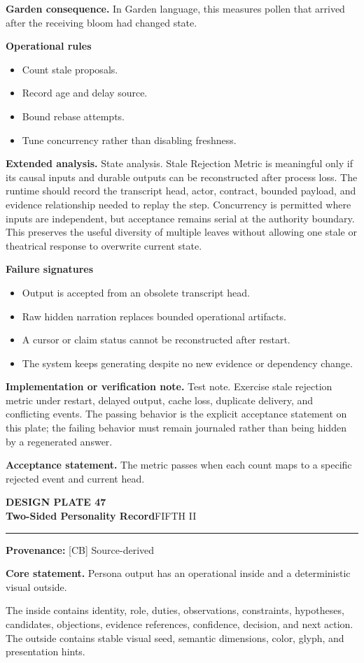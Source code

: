 \documentclass[10pt,letterpaper,oneside]{article}
\newcommand{\prov}[1]{\textcolor{gardenBlue}{\sffamily\footnotesize\textbf{Provenance:} #1}}
\newcommand{\platetitle}[3]{%
  \begin{minipage}[t][0.54in][t]{\textwidth}
  {\sffamily\bfseries\color{gardenDeep}\fontsize{9}{10}\selectfont DESIGN PLATE #1}\\[-1pt]
  {\sffamily\bfseries\color{gardenInk}\fontsize{16.5}{18}\selectfont #2}\hfill{\sffamily\color{gardenGreen}\large #3}
  \end{minipage}\vspace{-2pt}\hrule\vspace{5pt}}
\begin{document}
\textbf{Garden consequence.} In Garden language, this measures pollen that arrived after the receiving bloom had changed state.

\textbf{Operational rules}
\begin{itemize}
\item Count stale proposals.
\item Record age and delay source.
\item Bound rebase attempts.
\item Tune concurrency rather than disabling freshness.
\end{itemize}
\textbf{Extended analysis.} State analysis. Stale Rejection Metric is meaningful only if its causal inputs and durable outputs can be reconstructed after process loss. The runtime should record the transcript head, actor, contract, bounded payload, and evidence relationship needed to replay the step. Concurrency is permitted where inputs are independent, but acceptance remains serial at the authority boundary. This preserves the useful diversity of multiple leaves without allowing one stale or theatrical response to overwrite current state.

\textbf{Failure signatures}
\begin{itemize}
\item Output is accepted from an obsolete transcript head.
\item Raw hidden narration replaces bounded operational artifacts.
\item A cursor or claim status cannot be reconstructed after restart.
\item The system keeps generating despite no new evidence or dependency change.
\end{itemize}
\textbf{Implementation or verification note.} Test note. Exercise stale rejection metric under restart, delayed output, cache loss, duplicate delivery, and conflicting events. The passing behavior is the explicit acceptance statement on this plate; the failing behavior must remain journaled rather than being hidden by a regenerated answer.

\begin{acceptbox}
\textbf{Acceptance statement.} The metric passes when each count maps to a specific rejected event and current head.
\end{acceptbox}
\newpage
\platetitle{47}{Two-Sided Personality Record}{FIFTH II}
\prov{[CB] Source-derived}
\fontsize{8.85}{10.45}\selectfont
\begin{corebox}
\textbf{Core statement.} Persona output has an operational inside and a deterministic visual outside.
\end{corebox}
The inside contains identity, role, duties, observations, constraints, hypotheses, candidates, objections, evidence references, confidence, decision, and next action. The outside contains stable visual seed, semantic dimensions, color, glyph, and presentation hints.
\end{document}
